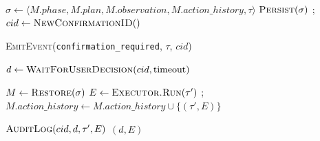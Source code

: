 \begin{algorithm}[t]
\caption{工作流 Checkpoint 与确认恢复 CheckpointResume}
\label{alg:checkpoint-resume}
\DontPrintSemicolon
{}

$\sigma \leftarrow \langle M.phase, M.plan, M.observation, M.action\_history, \tau \rangle$ 
$\textsc{Persist}(\sigma)$ ; $cid \leftarrow \textsc{NewConfirmationID}()$ \;

\textsc{EmitEvent}(\texttt{confirmation\_required}, $\tau$, $cid$) 

$d \leftarrow \textsc{WaitForUserDecision}(cid, \text{timeout})$ \;


$M \leftarrow \textsc{Restore}(\sigma)$ 
$E \leftarrow \textsc{Executor.Run}(\tau')$ ;
$M.action\_history \leftarrow M.action\_history \cup \{(\tau', E)\}$ \;

$\textsc{AuditLog}(cid, d, \tau', E)$ \;
\Return $(d, E)$
\end{algorithm}
